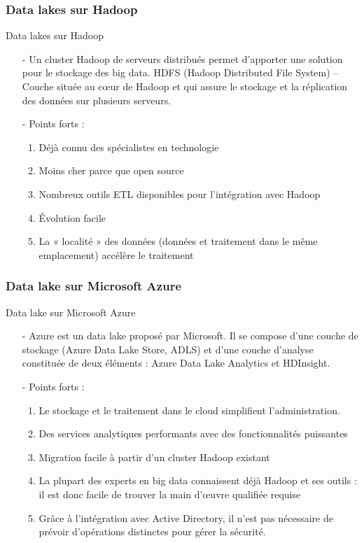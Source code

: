 \subsubsection{Data lakes sur Hadoop}
\begin{frame}{Data lakes sur Hadoop}
    
    \begin{itemize}\itemsep1em
        \item[-] Un cluster Hadoop de serveurs distribués permet d'apporter une solution pour le stockage des big data. HDFS (Hadoop Distributed File System) – Couche située au cœur de Hadoop et qui assure le stockage et la réplication des données sur plusieurs serveurs. 
        \item[-] Points forts :
        \begin{enumerate}
            \item Déjà connu des spécialistes en technologie
            \item Moins cher parce que open source
            \item Nombreux outils ETL disponibles pour l'intégration avec Hadoop
            \item Évolution facile
            \item La « localité » des données (données et traitement dans le même emplacement) accélère le traitement
        \end{enumerate}
    \end{itemize}
\end{frame}

\subsubsection{Data lake sur Microsoft Azure}
\begin{frame}{Data lake sur Microsoft Azure}
    \begin{itemize}\itemsep1em
        \item[-] Azure est un data lake proposé par Microsoft. Il se compose d'une couche de stockage (Azure Data Lake Store, ADLS) et d'une couche d'analyse constituée de deux éléments : Azure Data Lake Analytics et HDInsight.
        \item[-] Points forts :
        \begin{enumerate}
            \item Le stockage et le traitement dans le cloud simplifient l'administration.
            \item Des services analytiques performants avec des fonctionnalités puissantes
            \item Migration facile à partir d'un cluster Hadoop existant
            \item La plupart des experts en big data connaissent déjà Hadoop et ses outils : il est donc facile de trouver la main d'œuvre qualifiée requise
            \item Grâce à l'intégration avec Active Directory, il n'est pas nécessaire de prévoir d'opérations distinctes pour gérer la sécurité.
        \end{enumerate}
    \end{itemize}
\end{frame}

